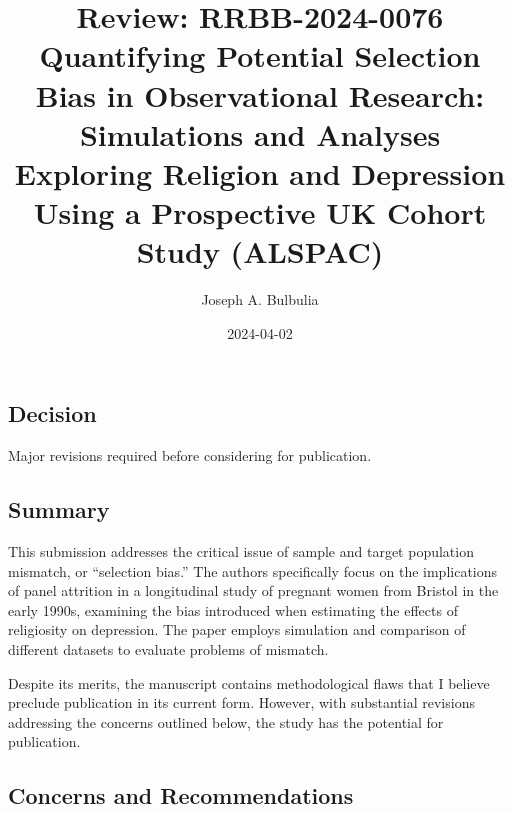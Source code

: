 \documentclass[
  singlecolumn]{article}
\title{Review: RRBB-2024-0076 Quantifying Potential Selection Bias in
Observational Research: Simulations and Analyses Exploring Religion and
Depression Using a Prospective UK Cohort Study (ALSPAC)}
\author{Joseph A. Bulbulia}
\date{2024-04-02}
\begin{document}
\maketitle

\subsection{Decision}\label{decision}

Major revisions required before considering for publication.

\subsection{Summary}\label{summary}

This submission addresses the critical issue of sample and target
population mismatch, or ``selection bias.'' The authors specifically
focus on the implications of panel attrition in a longitudinal study of
pregnant women from Bristol in the early 1990s, examining the bias
introduced when estimating the effects of religiosity on depression. The
paper employs simulation and comparison of different datasets to
evaluate problems of mismatch.

Despite its merits, the manuscript contains methodological flaws that I
believe preclude publication in its current form. However, with
substantial revisions addressing the concerns outlined below, the study
has the potential for publication.

\subsection{Concerns and
Recommendations}\label{concerns-and-recommendations}
\end{document}
